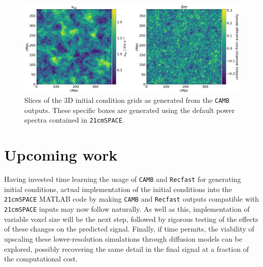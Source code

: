 \documentclass[floats,floatfix,showpacs,amssymb,prd,superscriptaddress,nofootinbib]{revtex4-2} %
\newcommand{\code}{\texttt}
\begin{document}
\begin{figure}[H]
    \centering
    \includegraphics[width=0.9\columnwidth]{images/initial_condition_grid.png}
    \caption{Slices of the 3D initial condition grids as generated from the \code{CAMB} outputs. These specific boxes are generated using the default power spectra contained in \code{21cmSPACE}.}
    \label{fig:initial_condition_grid}
\end{figure}


\section{Upcoming work}

Having invested time learning the usage of \code{CAMB} and \code{Recfast} for generating initial conditions, actual implementation of the initial conditions into the \code{21cmSPACE} MATLAB code by making \code{CAMB} and \code{Recfast} outputs compatible with \code{21cmSPACE} inputs may now follow naturally. As well as this, implementation of variable voxel size will be the next step, followed by rigorous testing of the effects of these changes on the predicted signal. Finally, if time permits, the viability of upscaling these lower-resolution simulations through diffusion models can be explored, possibly recovering the same detail in the final signal at a fraction of the computational cost.


\nocite{*}
\printbibliography[title={References}]
\end{document}

